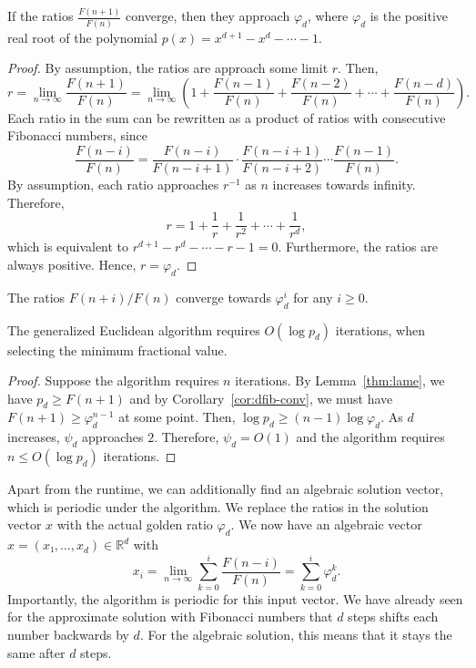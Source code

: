 \begin{theorem}
  If the ratios $\frac{F(n+1)}{F(n)}$ converge, then they approach $φ_d$,
  where $φ_d$ is the positive real root of the polynomial $p(x) = x^{d+1} - x^d - ⋯ - 1$.
\end{theorem}

\begin{proof}
  By assumption, the ratios are approach some limit $r$.
  Then,
  \[
    r
    = \lim_{n → ∞} \frac{F(n+1)}{F(n)}
    = \lim_{n → ∞} \left(1 + \frac{F(n-1)}{F(n)} + \frac{F(n-2)}{F(n)} + ⋯ + \frac{F(n-d)}{F(n)}\right).
  \]
  Each ratio in the sum can be rewritten as a product of ratios with
  consecutive Fibonacci numbers, since
  \[
    \frac{F(n - i)}{F(n)}
    = \frac{F(n - i)}{F(n - i + 1)} · \frac{F(n - i + 1)}{F(n - i + 2)} ⋯ \frac{F(n - 1)}{F(n)}.
  \]
  By assumption, each ratio approaches $r^{-1}$ as $n$ increases towards infinity.
  Therefore,
  \[
    r = 1 + \frac{1}{r} + \frac{1}{r^2} + ⋯ + \frac{1}{r^d},
  \]
  which is equivalent to $r^{d+1} - r^d - ⋯ - r - 1 = 0$.
  Furthermore, the ratios are always positive.
  Hence, $r = φ_d$.
\end{proof}

\begin{corollary}
  \label{cor:dfib-conv}
  The ratios $F(n + i)/F(n)$ converge towards $φ_d^i$ for any $i ≥ 0$.
\end{corollary}

\begin{theorem}
  The generalized Euclidean algorithm requires $O(\log p_d)$ iterations,
  when selecting the minimum fractional value.
\end{theorem}

\begin{proof}
  Suppose the algorithm requires $n$ iterations.
  By Lemma~\ref{thm:lame}, we have $p_d ≥ F(n+1)$
  and by Corollary~\ref{cor:dfib-conv}, we must have $F(n+1) ≥ φ_d^{n-1}$ at some point.
  Then, $\log p_d ≥ (n - 1) \log φ_d$.
  As $d$ increases, $ψ_d$ approaches $2$.
  Therefore, $ψ_d = O(1)$ and the algorithm requires $n ≤ O(\log p_d)$ iterations.
\end{proof}

Apart from the runtime, we can additionally find an algebraic solution vector,
which is periodic under the algorithm.
We replace the ratios in the solution vector $x$ with the actual golden ratio $φ_d$.
We now have an algebraic vector $x = (x₁, …, x_d) ∈ ℝ^d$ with
\[
  x_i
  = \lim_{n → ∞} \sum_{k=0}^i \frac{F(n - i)}{F(n)}
  = \sum_{k=0}^i φ_d^k.
\]
Importantly, the algorithm is periodic for this input vector.
We have already seen for the approximate solution with Fibonacci numbers
that $d$ steps shifts each number backwards by $d$.
For the algebraic solution, this means that it stays the same after $d$ steps.

